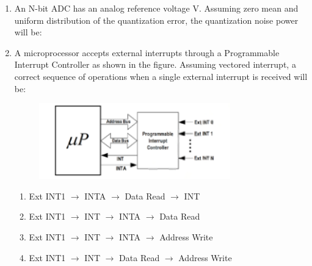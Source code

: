 \documentclass[journal,12pt,onecolumn]{IEEEtran}
\theoremstyle{remark}
\begin{document}
\begin{enumerate}
    \hfill{}
    
    \item An N-bit ADC has an analog reference voltage V. Assuming zero mean and uniform distribution of the quantization error, the quantization noise power will be:

    \hfill{}
        \begin{enumerate}
        \end{enumerate}
    
    \item A microprocessor accepts external interrupts  through a Programmable Interrupt Controller as shown in the figure. Assuming vectored interrupt, a correct sequence of operations when a single external interrupt  is received will be:
    \begin{figure}[H]
        \centering
        \includegraphics[width=0.6\columnwidth]{q42}
        \caption*{}
        \label{Q42}
    \end{figure}

    \hfill{}
    \begin{enumerate}
        \item Ext INT1 $\rightarrow$ INTA $\rightarrow$ Data Read $\rightarrow$ INT
        \item Ext INT1 $\rightarrow$ INT $\rightarrow$ INTA $\rightarrow$ Data Read
        \item Ext INT1 $\rightarrow$ INT $\rightarrow$ INTA $\rightarrow$ Address Write
        \item Ext INT1 $\rightarrow$ INT $\rightarrow$ Data Read $\rightarrow$ Address Write
    \end{enumerate}


\end{enumerate}
\end{document}
